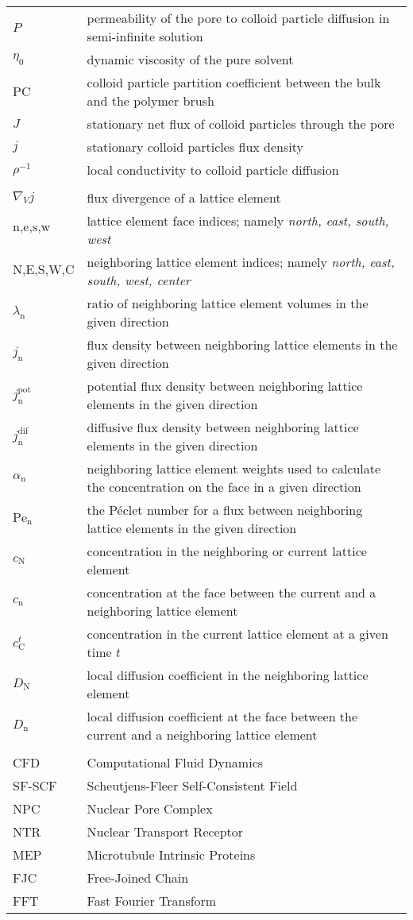 \documentclass[10pt, a4paper]{article}
\begin{document}
\begin{tabularx}{\linewidth}{l l}
$P$ & permeability of the pore to colloid particle diffusion in semi-infinite solution \\
$\eta_{0}$ & dynamic viscosity of the pure solvent \\
$\textrm{PC}$ & colloid particle partition coefficient between the bulk and the polymer brush \\
$J$ & stationary net flux of colloid particles through the pore \\
$j$ & stationary colloid particles flux density \\
$\rho^{-1}$ & local conductivity to colloid particle diffusion \\
\\
$\nabla_{V} j$ & flux divergence of a lattice element \\
$\textrm{n,e,s,w}$ & lattice element face indices; namely \textit{north, east, south, west} \\
$\textrm{N,E,S,W,C}$ & neighboring lattice element indices; namely \textit{north, east, south, west, center} \\
$\lambda_{\textrm{n}}$ & ratio of neighboring lattice element volumes in the given direction \\
$j_{\textrm{n}}$ & flux density between neighboring lattice elements in the given direction \\
$j^{\textrm{pot}}_{\textrm{n}}$ & potential flux density between neighboring lattice elements in the given direction \\
$j^{\textrm{dif}}_{\textrm{n}}$ & diffusive flux density between neighboring lattice elements in the given direction \\
$\alpha_{\textrm{n}}$ & neighboring lattice element weights used to calculate the concentration on the face in a given direction \\
$\textrm{Pe}_{\textrm{n}}$ & the Péclet number for a flux between neighboring lattice elements in the given direction \\
$c_{\textrm{N}}$ & concentration in the neighboring or current lattice element \\
$c_{\textrm{n}}$ & concentration at the face between the current and a neighboring lattice element \\ 
$c^{t}_{\textrm{C}}$ & concentration in the current lattice element at a given time $t$ \\ 
$D_{\textrm{N}}$ & local diffusion coefficient in the neighboring lattice element \\
$D_{\textrm{n}}$ & local diffusion coefficient at the face between the current and a neighboring lattice element \\
\\
CFD & Computational Fluid Dynamics \\
SF-SCF & Scheutjens-Fleer Self-Consistent Field \\
NPC & Nuclear Pore Complex \\
NTR & Nuclear Transport Receptor \\
MEP & Microtubule Intrinsic Proteins \\
FJC & Free-Joined Chain \\
FFT & Fast Fourier Transform \\
\end{tabularx}
\end{document}
